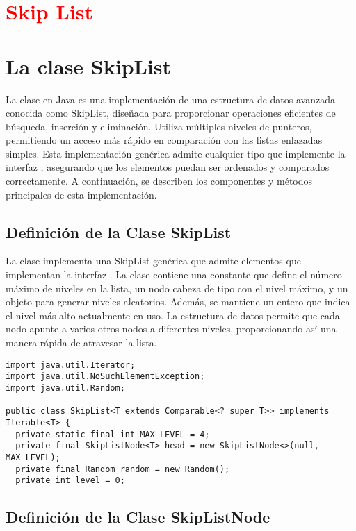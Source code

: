 \section{\textcolor{red}{Skip List}}

\section{La clase SkipList}

La clase  en Java es una implementación de una estructura de datos avanzada conocida como SkipList, diseñada para proporcionar operaciones eficientes de búsqueda, inserción y eliminación. Utiliza múltiples niveles de punteros, permitiendo un acceso más rápido en comparación con las listas enlazadas simples. Esta implementación genérica admite cualquier tipo que implemente la interfaz , asegurando que los elementos puedan ser ordenados y comparados correctamente. A continuación, se describen los componentes y métodos principales de esta implementación.

\subsection{Definición de la Clase SkipList}

La clase  implementa una SkipList genérica que admite elementos que implementan la interfaz . La clase contiene una constante  que define el número máximo de niveles en la lista, un nodo cabeza  de tipo  con el nivel máximo, y un objeto  para generar niveles aleatorios. Además, se mantiene un entero  que indica el nivel más alto actualmente en uso. La estructura de datos permite que cada nodo apunte a varios otros nodos a diferentes niveles, proporcionando así una manera rápida de atravesar la lista.

\begin{verbatim}
import java.util.Iterator;
import java.util.NoSuchElementException;
import java.util.Random;

public class SkipList<T extends Comparable<? super T>> implements Iterable<T> {
  private static final int MAX_LEVEL = 4; 
  private final SkipListNode<T> head = new SkipListNode<>(null, MAX_LEVEL);
  private final Random random = new Random();
  private int level = 0;
\end{verbatim}

\subsection{Definición de la Clase SkipListNode}

